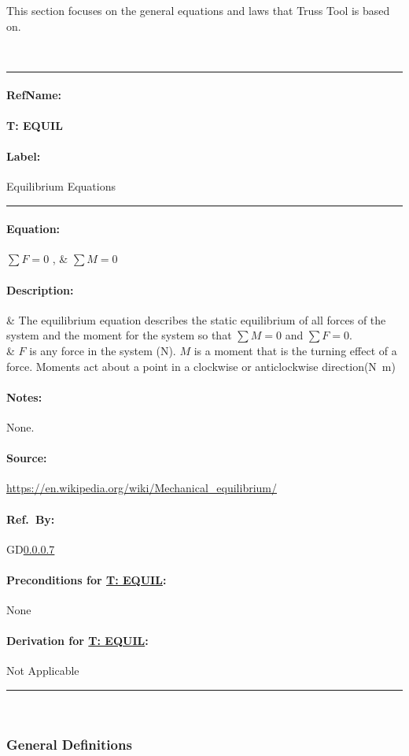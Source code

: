 \documentclass[12pt]{article}
\newcommand{\dref}[1]{GD\ref{#1}}
\newcommand{\deftheory}[9][Not Applicable]
{
\newpage
\noindent \rule{\textwidth}{0.5mm}

\paragraph{RefName: } \textbf{#2} \phantomsection 
\label{#2}

\paragraph{Label:} #3

\noindent \rule{\textwidth}{0.5mm}

\paragraph{Equation:}

#4

\paragraph{Description:}

#5

\paragraph{Notes:}

#6

\paragraph{Source:}

#7

\paragraph{Ref.\ By:}

#8

\paragraph{Preconditions for \hyperref[#2]{#2}:}
\label{#2_precond}

#9

\paragraph{Derivation for \hyperref[#2]{#2}:}
\label{#2_deriv}

#1

\noindent \rule{\textwidth}{0.5mm}

}
\begin{document}
This section focuses on the general equations and laws that Truss Tool is based on. 

~\newline

\noindent
\deftheory
{T: EQUIL}
{ Equilibrium Equations}
{
$\sum F = 0$ ,  & $\sum M = 0$\\
 
}
{  
   
 
  & The equilibrium equation describes the static equilibrium of all  forces of the system and the moment for the system so that $\sum M =0$ and $\sum F=0$.\\
  & $F$ is any force in the system (\si{\newton}). $M$ is a moment that is the turning effect of a force. Moments act about a point in a clockwise or anticlockwise direction(\si{\newton\metre})\\
}
{ 
None.
}
{
  \url{https://en.wikipedia.org/wiki/Mechanical_equilibrium/}
}
{
  \dref{}
}
{
None
}
{}



\newpage
~\newline

\subsubsection{General Definitions}\label{sec_gendef}

\end{document}
